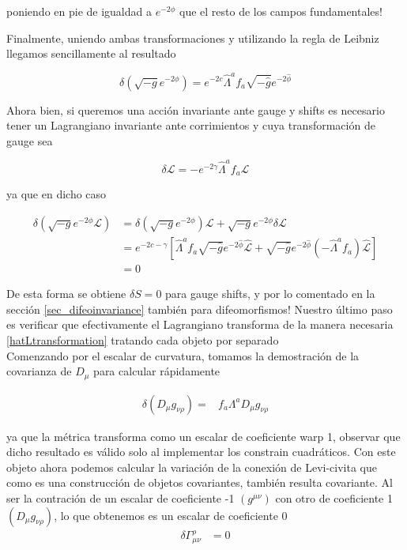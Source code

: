 \documentclass{article}
\numberwithin{equation}{section}
\begin{document}
poniendo en pie de igualdad a $ e^{-2\phi} $ que el resto de los campos fundamentales!

Finalmente, uniendo ambas transformaciones y utilizando la regla de Leibniz llegamos sencillamente al resultado

\begin{equation}
\delta \left( \sqrt{-g} e^{-2\phi} \right) = e^{-2 c} \hat{\Lambda}^a f_a \sqrt{-\hat{g}} e^{-2\hat{\phi}}
\end{equation}

Ahora bien, si queremos una acción invariante ante gauge y shifts es necesario tener un Lagrangiano invariante ante corrimientos y cuya transformación de gauge sea

\begin{equation}\label{hatLtransformation}
\delta \mathcal{L} = -e^{-2 \gamma} \hat{\Lambda}^a f_a \hat{\mathcal{L}}
\end{equation}

ya que en dicho caso

\begin{equation}
\begin{aligned}
\delta \left( \sqrt{-g}e^{-2 \phi} \mathcal{L}\right) &= \delta \left(\sqrt{-g}e^{-2 \phi} \right) \mathcal{L} + \sqrt{-g}e^{-2 \phi} \delta \mathcal{L}\\
&= e^{-2c - \gamma} \left[ \hat{\Lambda}^a f_a \sqrt{-\hat{g}}e^{-2 \hat{\phi}} \hat{\mathcal{L}} + \sqrt{-\hat{g}}e^{-2 \hat{\phi}} \left(- \hat{\Lambda}^a f_a \right) \hat{\mathcal{L}}\right]\\
&= 0
\end{aligned}
\end{equation}

De esta forma se obtiene $ \delta S =0 $ para gauge shifts, y por lo comentado en la sección \ref{sec_difeoinvariance} también para difeomorfismos! Nuestro último paso es verificar que efectivamente el Lagrangiano transforma de la manera necesaria \ref{hatLtransformation} tratando cada objeto por separado\\	


Comenzando por el escalar de curvatura, tomamos la demostración de
la covarianza de $D_{\mu}$ para calcular rápidamente

\begin{align*}
\delta\left(D_{\mu}g_{\nu\rho}\right)= & f_{a}\Lambda^{a}D_{\mu}g_{\nu\rho}
\end{align*}


ya que la métrica transforma como un escalar de coeficiente warp 1,
observar que dicho resultado es válido solo al implementar los constrain
cuadráticos. Con este objeto ahora podemos calcular la variación de
la conexión de Levi-civita que como es una construcción de objetos
covariantes, también resulta covariante. Al ser la contración de un
escalar de coeficiente -1 $(g^{\mu\nu})$ con otro de coeficiente
1 $\left(D_{\mu}g_{\nu\rho}\right)$, lo que obtenemos es un escalar
de coeficiente 0
\begin{align}
\delta\Gamma_{\mu\nu}^{\rho} & =0\label{hatlevitransformation}
\end{align}
\end{document}
